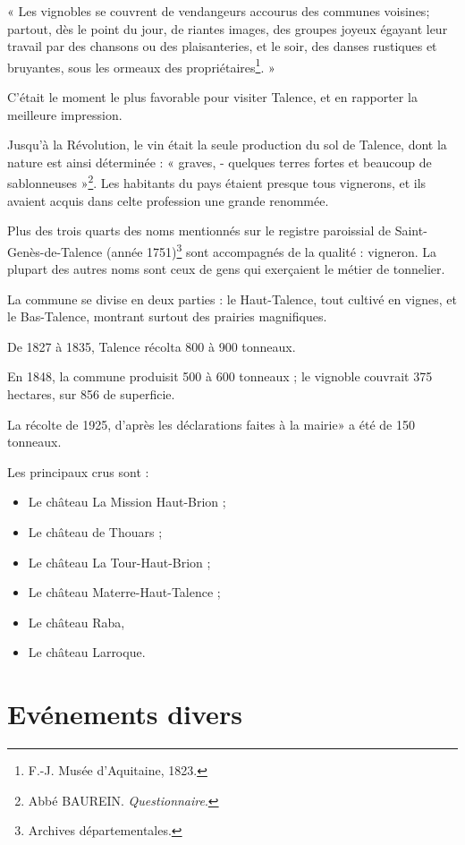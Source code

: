 \documentclass[a4paper,11pt]{book}
\begin{document}
« Les vignobles se couvrent de vendangeurs accourus des communes voisines; partout, dès le point du jour, de riantes images, des groupes joyeux égayant leur travail par des chansons ou des plaisanteries, et le soir, des danses rustiques et bruyantes, sous les ormeaux des propriétaires\footnote{F.-J. Musée d'Aquitaine, 1823.}. »

C'était le moment le plus favorable pour visiter Talence, et en rapporter la meilleure impression. 

Jusqu'à la Révolution, le vin était la seule production du sol de Talence, dont la nature est ainsi déterminée : « graves, - quelques terres fortes et beaucoup de sablonneuses »\footnote{Abbé BAUREIN. \textit{Questionnaire}.}. Les habitants du pays étaient presque tous vignerons, et ils avaient acquis dans celte profession une
grande renommée.

Plus des trois quarts des noms mentionnés sur le registre paroissial de Saint-Genès-de-Talence (année 1751)\footnote{Archives départementales.} sont accompagnés de la qualité : vigneron. La plupart des autres noms sont ceux de gens qui exerçaient le métier de tonnelier.

La commune se divise en deux parties : le Haut-Talence, tout cultivé en vignes, et le Bas-Talence, montrant surtout des prairies magnifiques.

De 1827 à 1835, Talence récolta 800 à 900 tonneaux.

En 1848, la commune produisit 500 à 600 tonneaux ; le vignoble couvrait 375 hectares, sur 856 de superficie.

La récolte de 1925, d'après les déclarations faites à la
mairie» a été de 150 tonneaux.

Les principaux crus sont :
        \begin{itemize}
        	\item[] Le château La Mission Haut-Brion ;
        	\item[] Le château de Thouars ;
        	\item[] Le château La Tour-Haut-Brion ;
        	\item[] Le château Materre-Haut-Talence ;
        	\item[] Le château Raba,
        	\item[] Le château Larroque.
        \end{itemize}

\section{Evénements divers}
\end{document}
